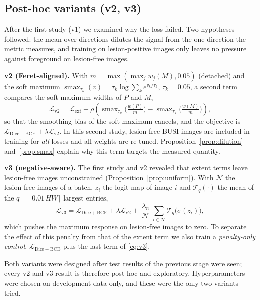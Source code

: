 \documentclass{midl}
\DeclareMathOperator{\smax}{smax}
\begin{document}
\subsection{Post-hoc variants (v2, v3)}
After the first study (v1) we examined why the loss failed. Two hypotheses followed: the mean over directions dilutes the signal from the one direction the metric measures, and training on lesion-positive images only leaves no pressure against foreground on lesion-free images.

\textbf{v2 (Feret-aligned).} With $m=\max(\max_j w_j(M),0.05)$ (detached) and the soft maximum $\smax_{\tau_k}(v)=\tau_k\log\sum_{k}e^{v_k/\tau_k}$, $\tau_k=0.05$, a second term compares the soft-maximum widths of $P$ and $M$,
\begin{equation}\label{eq:v2}
\mathcal{L}_{\mathrm{v2}}=\mathcal{L}_{\mathrm{ext}}+\rho\!\left(\smax_{\tau_k}\!\Big(\tfrac{w(P)}{m}\Big)-\smax_{\tau_k}\!\Big(\tfrac{w(M)}{m}\Big)\right),
\end{equation}
so that the smoothing bias of the soft maximum cancels, and the objective is $\mathcal{L}_{\mathrm{Dice+BCE}}+\lambda\mathcal{L}_{\mathrm{v2}}$. In this second study, lesion-free BUSI images are included in training for \emph{all} losses and all weights are re-tuned. Proposition~\ref{prop:dilution} and~\ref{prop:smax} explain why this term targets the measured quantity.

\textbf{v3 (negative-aware).} The first study and v2 revealed that extent terms leave lesion-free images unconstrained (Proposition~\ref{prop:uniform}). With $\mathcal{N}$ the lesion-free images of a batch, $z_i$ the logit map of image $i$ and $\mathcal{T}_{q}(\cdot)$ the mean of the $q=\lceil0.01\,HW\rceil$ largest entries,
\begin{equation}\label{eq:v3}
\mathcal{L}_{\mathrm{v3}}=\mathcal{L}_{\mathrm{Dice+BCE}}+\lambda\mathcal{L}_{\mathrm{v2}}+\frac{\lambda_n}{|\mathcal{N}|}\sum_{i\in\mathcal{N}}\mathcal{T}_{q}\big(\sigma(z_i)\big),
\end{equation}
which pushes the maximum response on lesion-free images to zero. To separate the effect of this penalty from that of the extent term we also train a \emph{penalty-only control}, $\mathcal{L}_{\mathrm{Dice+BCE}}$ plus the last term of \eqref{eq:v3}.

Both variants were designed after test results of the previous stage were seen; every v2 and v3 result is therefore post hoc and exploratory. Hyperparameters were chosen on development data only, and these were the only two variants tried.
\end{document}
